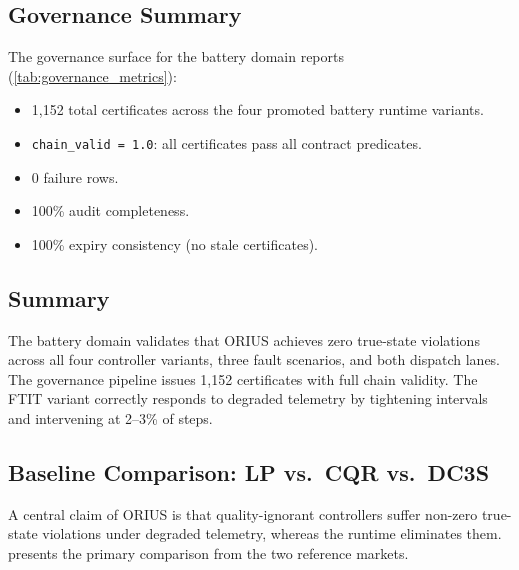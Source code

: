 \subsection{Governance Summary}

The governance surface for the battery domain reports (\cref{tab:governance_metrics}):
\begin{itemize}[nosep]
  \item 1{,}152 total certificates across the four promoted battery runtime variants.
  \item \texttt{chain\_valid = 1.0}: all certificates pass all contract predicates.
  \item 0 failure rows.
  \item 100\% audit completeness.
  \item 100\% expiry consistency (no stale certificates).
\end{itemize}

\subsection{Summary}

The battery domain validates that ORIUS \dcs{} achieves zero true-state violations
across all four controller variants, three fault scenarios, and both dispatch lanes.
The governance pipeline issues 1{,}152 certificates with full chain validity.  The
FTIT variant correctly responds to degraded telemetry by tightening intervals and
intervening at 2--3\% of steps.

\subsection{Baseline Comparison: LP vs.\ CQR vs.\ DC3S}

A central claim of ORIUS is that quality-ignorant controllers suffer non-zero
true-state violations under degraded telemetry, whereas the \dcs{} runtime
eliminates them.   presents the primary comparison
from the two reference markets.

